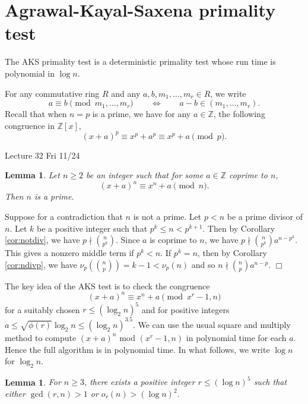 \documentclass{article}
\def\Z{{\mathbb Z}}
\def\Z{{\mathbb Z}}
\newtheorem{lemma}[subsection]{Lemma}
\newenvironment{proof}{\noindent {\bf Proof:}}{$\Box$ \vspace{2 ex}}
\newcommand{\add}[1]{{\color{blue} #1}}
\begin{document}
\section{Agrawal-Kayal-Saxena primality test}
The AKS primality test is a deterministic primality test whose run time is polynomial in $\log n$. %

For any commutative ring $R$ and any $a,b,m_1,\ldots,m_r\in R$, we write $$a\equiv b\pmod{m_1,\ldots,m_r}\qquad\Longleftrightarrow\qquad a - b \in (m_1,\ldots,m_r).$$ Recall that when $n = p$ is a prime, we have for any $a\in\Z$, the following congruence in $\Z[x]$, $$(x + a)^p\equiv x^p + a^p\equiv x^p + a\pmod{p}.$$
\begin{center}
    \add{Lecture 32 Fri 11/24}
\end{center}
\begin{lemma}\label{lem:np}
    Let $n\geq 2$ be an integer such that for some $a\in\Z$ coprime to $n$,
    $$(x + a)^n \equiv x^n + a\pmod{n}.$$
    Then $n$ is a prime.
\end{lemma}

\begin{proof}
    Suppose for a contradiction that $n$ is not a prime. Let $p<n$ be a prime divisor of $n$. Let $k$ be a positive integer such that $p^k \leq n < p^{k+1}$. Then by Corollary \ref{cor:notdiv}, we have $p\nmid \binom{n}{p^k}$. Since $a$ is coprime to $n$, we have $p\nmid \binom{n}{p^k}a^{n-p^k}$. This gives a nonzero middle term if $p^k < n$. If $p^k = n$, then by Corollary \ref{cor:ndivp}, we have $\nu_p(\binom{n}{p}) = k-1 < \nu_p(n)$ and so $n\nmid \binom{n}{p}a^{n-p}.$
\end{proof}



The key idea of the AKS test is to check the congruence
$$(x + a)^n \equiv x^n + a\pmod{x^r -1, n}$$
for a suitably chosen $r \leq (\log_2 n)^5$ and for positive integers $a\leq \sqrt{\phi(r)}\log_2n \leq (\log_2n)^{3.5}.$ We can use the usual square and multiply method to compute $(x+a)^n$ mod $(x^r - 1,n)$ in polynomial time for each $a$. Hence the full algorithm is in polynomial time. In what follows, we write $\log n$ for $\log_2 n$.

\begin{lemma}
    For $n\geq 3$, there exists a positive integer $r\leq (\log n)^5$ such that either $\gcd(r,n) > 1$ or $o_r(n) > (\log n)^2.$
\end{lemma}
\end{document}
